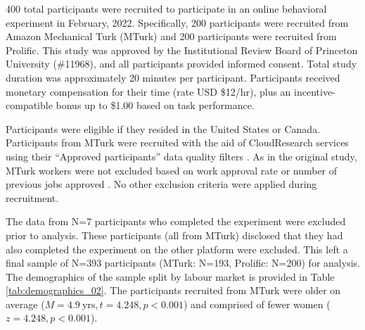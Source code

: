 \documentclass[a4paper,notitlepage,12pt]{article}
\begin{document}
\begin{refsection}[supp]
400 total participants were recruited to participate in an online behavioral experiment in February, 2022. Specifically, 200 participants were recruited from Amazon Mechanical Turk (MTurk) and 200 participants were recruited from Prolific. This study was approved by the Institutional Review Board of Princeton University (\#11968), and all participants provided informed consent. Total study duration was approximately 20 minutes per participant. Participants received monetary compensation for their time (rate USD \$12/hr), plus an incentive-compatible bonus up to \$1.00 based on task performance. 

Participants were eligible if they resided in the United States or Canada. Participants from MTurk were recruited with the aid of CloudResearch services \cite{litman2017turkprime-2} using their ``Approved participants''  data quality filters \cite{cloudresearch_2020-2}. As in the original study, MTurk workers were not excluded based on work approval rate or number of previous jobs approved \cite{robinson2019tapped-2}. No other exclusion criteria were applied during recruitment.

The data from N=7 participants who completed the experiment were excluded prior to analysis. These participants (all from MTurk) disclosed that they had also completed the experiment on the other platform were excluded. This left a final sample of N=393 participants (MTurk: N=193, Prolific: N=200) for analysis. The demographics of the sample split by labour market is provided in Table \ref{tab:demographics_02}. The participants recruited from MTurk were older on average ($M = 4.9 \ \text{yrs}, t = 4.248, p < 0.001$) and comprised of fewer women ($z = 4.248, p < 0.001$). 


\end{refsection}
\end{document}
